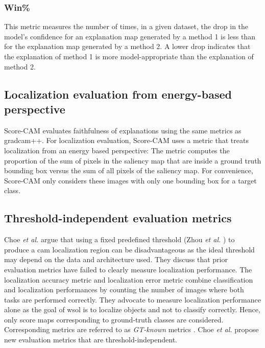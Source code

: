 \subsubsection{Win\%}
This metric measures the number of times, in a given dataset, the drop in the model's confidence for an explanation map generated by a method 1 is less than for the explanation map generated by a method 2. A lower drop indicates that the explanation of method 1 is more model-appropriate than the explanation of method 2.

\subsection{Localization evaluation from energy-based perspective}
Score-CAM evaluates faithfulness of explanations using the same metrics as \acrshort{gradcam}++. For localization evaluation, Score-CAM uses a metric that treats localization from an energy based perspective: The metric computes the proportion of the sum of pixels in the saliency map that are inside a ground truth bounding box versus the sum of all pixels of the saliency map. For convenience, Score-CAM only considers these images with only one bounding box for a target class.

\subsection{Threshold-independent evaluation metrics}
Choe \textit{et al.} \cite{choe2020evaluating, choe2022evaluation} argue that using a fixed predefined threshold (Zhou \textit{et al.} \cite{zhou2016cvpr}) to produce a \acrshort{cam} localization region can be disadvantageous as the ideal threshold may depend on the data and architecture used. They discuss that prior evaluation metrics have failed to clearly measure localization performance. The localization accuracy metric \cite{russakovsky2015imagenet} and localization error \cite{zhou2016cvpr, selvaraju2017grad} metric combine classification and localization performances by counting the number of images where both tasks are performed correctly. They advocate to measure localization performance alone as the goal of \acrshort{wsol} is to localize objects and not to classify correctly. Hence, only score maps corresponding to ground-truth classes are considered. Corresponding metrics are referred to as \textit{GT-known} metrics \cite{choe2019attention, singh2017hide, zhang2018adversarial, zhang2018self}. Choe \textit{et al.} propose new evaluation metrics that are threshold-independent.

